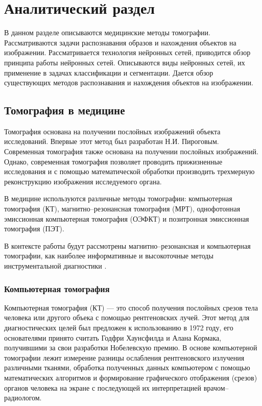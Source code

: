 \section{Аналитический раздел}

В данном разделе описываются медицинские методы томографии. Рассматриваются задачи распознавания образов и нахождения объектов на изображении. Рассматривается технология нейронных сетей, приводится обзор принципа работы нейронных сетей. Описываются виды нейронных сетей, их применение в задачах классификации и сегментации. Дается обзор существующих методов распознавания и нахождения объектов на изображении.

\subsection{Томография в медицине}

Томография основана на получении послойных изображений объекта исследований. Впервые этот метод был разработан Н.И. Пироговым. Современная томография также основана на получении послойных изображений. Однако, современная томография позволяет проводить прижизненные исследования и с помощью математической обработки производить трехмерную реконструкцию изображения исследуемого органа.

В медицине используются различные методы томографии: компьютерная томография (КТ), магнитно--резонансная томография (МРТ), однофотонная эмиссионная компьютерная томография (ОЭФКТ) и позитронная эмиссионная томография (ПЭТ).

В контексте работы будут рассмотрены магнитно--резонансная и компьютерная томографии, как наиболее информативные и высокоточные методы инструментальной диагностики \cite{ctmrt}.

\subsubsection{Компьютерная томография}

Компьютерная томография (КТ) --- это способ получения послойных срезов тела человека или другого объека с помощью рентгеновских лучей. Этот метод для диагностических целей был предложен к использованию в 1972 году, его основателями принято считать Годфри Хаунсфилда и Алана Кормака, получившими за свои разработки Нобелевскую премию. В основе компьютерной томографии лежит измерение разницы ослабления рентгеновского излучения различными тканями, обработка полученных данных компьютером с помощью математических алгоритмов и формирование графического отображения (срезов) органов человека на экране с последующей их интерпретацией врачом--радиологом.

